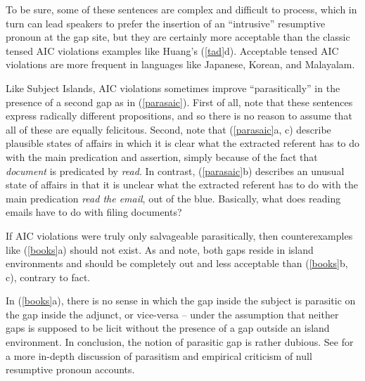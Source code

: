 \documentclass[output=paper
                ,modfonts
                ,nonflat
	        ,collection
	        ,collectionchapter
	        ,collectiontoclongg
 	        ,biblatex
                ,babelshorthands
                ,newtxmath
                ,draftmode
                ,colorlinks, citecolor=brown
]{./langsci/langscibook}
\begin{document}
\noindent 
To be sure, some of these  sentences are complex and difficult to process,  
which in turn can lead speakers to prefer the insertion of an ``intrusive'' resumptive 
pronoun at the gap site, but they are certainly more acceptable than the 
classic tensed AIC violations examples like Huang's (\ref{tad}d).
Acceptable tensed AIC violations are more frequent in languages like Japanese, Korean,  and Malayalam.

Like Subject Islands, AIC violations sometimes improve ``parasitically'' in the presence of a second gap as in (\ref{parasaic}). First of all, note that these sentences express radically different propositions, and so there is no reason to assume that all of these are equally felicitous.
Second, note that (\ref{parasaic}a, c) describe plausible  states of affairs in which it is clear what the extracted referent has to do with the main predication and assertion, simply because of the fact that \emph{document}  is predicated by \emph{read}.  In contrast, (\ref{parasaic}b) describes an unusual state of affairs in that  it is unclear what the extracted referent  has to do with the main predication \emph{read the email}, out of the blue. Basically, what does reading emails have to do with filing documents?

\eal \label{parasaic}
\zl

\noindent
If AIC violations were truly only salvageable parasitically, then counterexamples
like (\ref{books}a) should not exist.  As 
\citet{Levine:Sag:03} and
\citet[256]{levhubook}
note, both gaps reside in island environments and should be 
completely out and less acceptable than (\ref{books}b, c), contrary to fact.

\eal  \label{books}
\zl

\noindent
In (\ref{books}a), there is no sense in which the gap inside the subject is parasitic on the gap inside the  adjunct, or vice-versa -- under the assumption that neither gaps is supposed to be licit without  the presence of a gap outside an island environment. In conclusion, the notion of parasitic 
gap is rather dubious. See \citet{levhubook} for a more in-depth discussion of parasitism and 
empirical criticism of null resumptive pronoun accounts.
\end{document}
